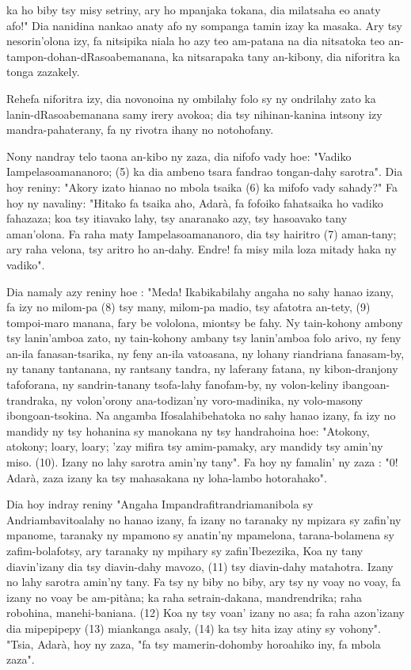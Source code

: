 ka ho biby tsy misy setriny, ary ho mpanjaka tokana, dia milatsaha
eo anaty afo!" Dia nanidina nankao anaty afo ny sompanga tamin izay
ka masaka. Ary tsy nesorin'olona izy, fa nitsipika niala ho azy teo am-patana
na dia nitsatoka teo an-tampon-dohan-dRasoabemanana, ka nitsarapaka
tany an-kibony, dia niforitra ka tonga zazakely.

Rehefa niforitra izy, dia novonoina ny ombilahy folo sy ny ondrilahy
zato ka lanin-dRasoabemanana samy irery avokoa; dia tsy nihinan-kanina
intsony izy mandra-pahaterany, fa ny rivotra ihany no notohofany.

Nony nandray telo taona an-kibo ny zaza, dia nifofo vady hoe:
"Vadiko Iampelasoamananoro; (5) ka dia ambeno tsara fandrao tongan-dahy sarotra".
Dia hoy reniny: "Akory izato hianao no mbola tsaika (6) ka mifofo vady sahady?"
Fa hoy ny navaliny: "Hitako fa tsaika aho, Adarà, fa fofoiko fahatsaika ho vadiko fahazaza;
koa tsy itiavako lahy, tsy anaranako azy, tsy hasoavako tany aman'olona.
Fa raha maty Iampelasoamananoro, dia tsy hairitro (7) aman-tany; ary raha velona,
tsy aritro ho an-dahy. Endre! fa misy mila loza mitady haka ny vadiko".

Dia namaly azy reniny hoe : "Meda! Ikabikabilahy angaha no sahy
hanao izany, fa izy no milom-pa (8) tsy many, milom-pa madio, tsy afatotra
an-tety, (9) tompoi-maro manana, fary be vololona, miontsy be fahy.
Ny tain-kohony ambony tsy lanin'amboa zato, ny tain-kohony ambany tsy lanin'amboa folo arivo,
ny feny an-ila fanasan-tsarika, ny feny an-ila vatoasana,
ny lohany riandriana fanasam-by, ny tanany tantanana, ny rantsany tandra,
ny laferany fatana, ny kibon-dranjony tafoforana, ny sandrin-tanany tsofa-lahy fanofam-by, 
ny volon-keliny ibangoan-trandraka, ny volon'orony ana-todizan'ny voro-madinika,
ny volo-masony ibongoan-tsokina. Na angamba Ifosalahibehatoka no sahy hanao izany, 
fa izy no mandidy ny tsy hohanina sy manokana ny tsy handrahoina hoe: "Atokony, atokony; loary, loary;
'zay mifira tsy amim-pamaky, ary mandidy tsy amin'ny miso. (10). Izany
no lahy sarotra amin'ny tany". Fa hoy ny famalin' ny zaza : "0! Adarà,
zaza izany ka tsy mahasakana ny loha-lambo hotorahako".

Dia hoy indray reniny "Angaha Impandrafitrandriamanibola sy
Andriambavitoalahy no hanao izany, fa izany no taranaky ny mpizara sy
zafin'ny mpanome, taranaky ny mpamono sy anatin'ny mpamelona, tarana-bolamena sy zafim-bolafotsy, 
ary taranaky ny mpihary sy zafin'Ibezezika, Koa ny tany diavin'izany dia tsy diavin-dahy mavozo,
(11) tsy diavin-dahy matahotra. Izany no lahy sarotra amin'ny tany. Fa tsy ny biby no biby, 
ary tsy ny voay no voay, fa izany no voay be am-pitàna; ka raha
setrain-dakana, mandrendrika; raha robohina, manehi-baniana. (12) Koa
ny tsy voan' izany no asa; fa raha azon'izany dia mipepipepy (13) miankanga asaly, 
(14) ka tsy hita izay atiny sy vohony". "Tsia, Adarà, hoy ny zaza, 
"fa tsy mamerin-dohomby horoahiko iny, fa mbola zaza".

